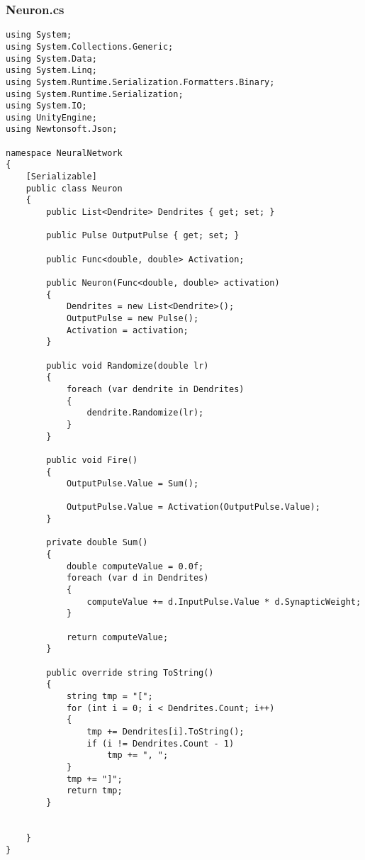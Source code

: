 \documentclass[12pt,a4paper]{article}
\begin{document}
\subsubsection*{Neuron.cs}
\begin{lstlisting}
using System;
using System.Collections.Generic;
using System.Data;
using System.Linq;
using System.Runtime.Serialization.Formatters.Binary;
using System.Runtime.Serialization;
using System.IO;
using UnityEngine;
using Newtonsoft.Json;

namespace NeuralNetwork
{
    [Serializable]
    public class Neuron
    {
        public List<Dendrite> Dendrites { get; set; }

        public Pulse OutputPulse { get; set; }

        public Func<double, double> Activation;

        public Neuron(Func<double, double> activation)
        {
            Dendrites = new List<Dendrite>();
            OutputPulse = new Pulse();
            Activation = activation;
        }

        public void Randomize(double lr)
        {
            foreach (var dendrite in Dendrites)
            {
                dendrite.Randomize(lr);
            }
        }

        public void Fire()
        {
            OutputPulse.Value = Sum();

            OutputPulse.Value = Activation(OutputPulse.Value);
        }

        private double Sum()
        {
            double computeValue = 0.0f;
            foreach (var d in Dendrites)
            {
                computeValue += d.InputPulse.Value * d.SynapticWeight;
            }

            return computeValue;
        }

        public override string ToString()
        {
            string tmp = "[";
            for (int i = 0; i < Dendrites.Count; i++)
            {
                tmp += Dendrites[i].ToString();
                if (i != Dendrites.Count - 1)
                    tmp += ", ";
            }
            tmp += "]";
            return tmp;
        }


    }
}






\end{lstlisting}
\pagebreak
\end{document}
